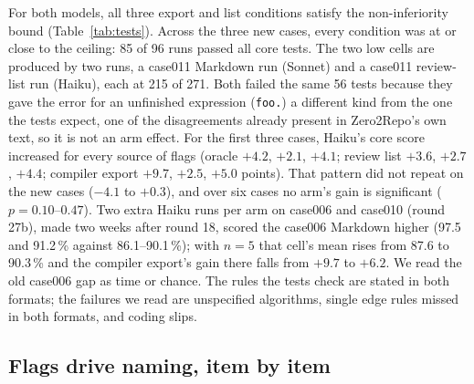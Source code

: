 \documentclass{article}
\newcommand{\code}[1]{\texttt{#1}}
\begin{document}
For both models, all three export and list conditions satisfy the non-inferiority bound (Table~\ref{tab:tests}). Across the three new cases, every condition was at or close to the ceiling: 85 of 96 runs passed all core tests. The two low cells are produced by two runs, a case011 Markdown run (Sonnet) and a case011 review-list run
(Haiku), each at 215 of 271. Both failed the same 56 tests because they gave the error for an unfinished
expression (\code{foo.}) a different kind from the one the tests expect, one of the disagreements already
present in Zero2Repo's own text, so it is not an arm
effect. For the first three cases, Haiku's core score increased for every source of flags (oracle $+4.2$, $+2.1$,
$+4.1$; review list $+3.6$, $+2.7$, $+4.4$; compiler export $+9.7$, $+2.5$, $+5.0$ points). That pattern did not
repeat on the new cases ($-4.1$ to $+0.3$), and over six cases no arm's gain is significant
($p = 0.10$--$0.47$). Two extra Haiku runs per arm on case006 and case010 (round 27b), made two weeks after
round 18, scored the case006 Markdown higher (97.5 and 91.2\,\% against 86.1--90.1\,\%); with $n = 5$ that
cell's mean rises from 87.6 to 90.3\,\% and the compiler export's gain there falls from $+9.7$ to $+6.2$. We read
the old case006 gap as time or chance. The rules the tests check are stated in both formats; the failures
we read are unspecified algorithms, single edge rules missed in both formats, and coding slips.

\subsection{Flags drive naming, item by item}\label{sec:naming}
\end{document}
